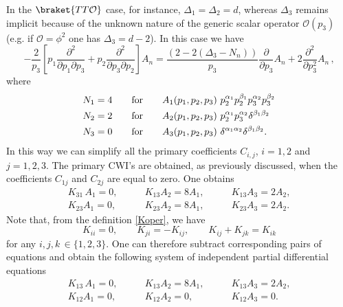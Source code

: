 \documentclass[a4paper,11pt,openright,twoside]{book}
\newcommand{\mO}{\mathcal{O}}
\numberwithin{equation}{section}
\begin{document}
{{{	In the $\braket{TT\mO}$ case, for instance, $\Delta_1=\Delta_2=d$, whereas $\Delta_3$ remains implicit because of the unknown nature of the generic scalar operator $\mathcal{O}(p_3)$ (e.g. if $\mathcal{O}=\phi^2$ one has $\Delta_3=d-2$). 
	In this case we have
	\begin{equation}
		-\frac{2}{p_3}  \left[ p_1 \frac{\partial^2}{\partial p_1 \partial p_3} +  p_2 \frac{\partial^2}{\partial p_3 \partial p_2}  \right]  A_n = \frac{\left( 2 - 2 (\Delta_3 - N_n)\right)}{p_3} \frac{\partial}{\partial p_3} A_n +2  \frac{\partial^2}{\partial p_3^2} A_n \,,
	\end{equation}
	where
	\begin{align} 
		N_1&=4    \qquad\textup{for} \qquad   A_1(p_1,p_2,p_3)\,\, p_2^{\alpha_1} p_2^{\beta_1} p_3^{\alpha_2} p_3^{\beta_2} \\
		N_2&=2 \qquad\textup{for} \qquad A_2(p_1,p_2,p_3)\,\, p_2^{\alpha_1} p_3^{\alpha_2} \delta^{\beta_1\beta_2}  \\
		N_3&=0    \qquad \textup{for}  \qquad  A_3(p_1,p_2,p_3)\,\, \delta^{\alpha_1\alpha_2} \delta^{\beta_1\beta_2}. 
	\end{align}
	In this way we can simplify all the primary coefficients $C_{i,j}$, $i=1,2$ and $j=1,2,3$.
	The primary CWI's are obtained, as previously discussed, when the coefficients $C_{1j}$ and $C_{2j}$ are equal to zero. One obtains
	\begin{equation}
		\begin{matrix}
			K_{31}\,A_1=0,&\qquad K_{13}A_2=8A_1,&\qquad K_{13}A_3=2A_2,\\[1.3ex]
			K_{23}A_1=0,&\qquad K_{23}A_2=8A_1,&\qquad K_{23}A_3=2A_2.
		\end{matrix}
	\end{equation} 
	Note that, from the definition \eqref{Koper}, we have
	\begin{equation}
		K_{ii}=0,\qquad K_{ji}=-K_{ij},\qquad K_{ij}+K_{jk}=K_{ik}
	\end{equation}
	for any $i,j,k\,\in\{1,2,3\}$. One can therefore subtract corresponding pairs of equations and obtain the following system of independent partial differential equations
	\begin{equation}
		\begin{matrix}
			K_{13}\,A_1=0,&\qquad K_{13}A_2=8A_1,&\qquad K_{13}A_3=2A_2,\\[1.3ex]
			K_{12}A_1=0,&\qquad K_{12}A_2=0,&\qquad K_{12}A_3=0.
		\end{matrix}\label{primaryCWI}
	\end{equation} 
	
}}}
\end{document}
